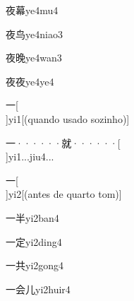 \begin{verbete}[8;13]{夜幕}{ye4mu4}
\end{verbete}

\begin{verbete}[8;5]{夜鸟}{ye4niao3}
\end{verbete}

\begin{verbete}[8;11]{夜晚}{ye4wan3}
\end{verbete}

\begin{verbete}[8;6]{夜夜}{ye4ye4}
\end{verbete}

\begin{verbete}[1]{一}[\\]{yi1}[(quando usado sozinho)]
\end{verbete}

\begin{verbete}[1;8]{一······就······}[\\]{yi1...jiu4...}
\end{verbete}

\begin{verbete}[1]{一}[\\]{yi2}[(antes de quarto tom)]
\end{verbete}

\begin{verbete}[1;5]{一半}{yi2ban4}
\end{verbete}

\begin{verbete}[1;8]{一定}{yi2ding4}
\end{verbete}

\begin{verbete}[1;6]{一共}{yi2gong4}
\end{verbete}

\begin{verbete}[1;6;2]{一会儿}{yi2huir4}
\end{verbete}

